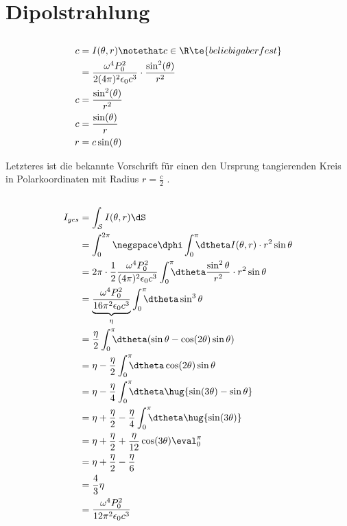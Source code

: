 \documentclass[11pt]{article}
\begin{document}
\section{Dipolstrahlung}
\subsection{}
\begin{align*}
    c &= I(\theta,r)\notethat c\in\R  \te{ beliebig aber fest}\\
    &= \frac{\omega^4 P_0^2}{2(4\pi)^2\epsilon_0 c^3}\cdot \frac{\sin^2(\theta)}{r^2}\\
    c &= \frac{\sin^2(\theta)}{r^2}\\
    c &= \frac{\sin(\theta)}{r}\\
    r &= c \sin(\theta)\
\end{align*}
\begin{adjustwidth}{20pt}{}
    Letzteres ist die bekannte Vorschrift für einen den Ursprung tangierenden Kreis in 
    Polarkoordinaten mit Radius \(r=\frac{c}{2}\) . 
\end{adjustwidth}

\subsection{}
\begin{align*}
    I_{ges} &= \int_{\mathcal S} I(\theta,r)\dS\\
    &= \int_{0}^{2\pi}\negspace\dphi\int_{0}^{\pi}\hspace{-0.2cm}\dtheta I(\theta,r)\cdot r^2 \sin\theta\\
    &= 2\pi\cdot \frac{1}{2}\frac{\omega^4 P_0^2}{(4\pi)^2 \epsilon_0 c^3}\int_{0}^{\pi}\hspace{-0.2cm}\dtheta \frac{\sin^2\theta}{r^2}\cdot r^2 \sin\theta\\
    &= \underbrace{\frac{\omega^4 P_0^2}{16\pi^2 \epsilon_0 c^3}}_{\eta}\int_{0}^{\pi}\hspace{-0.2cm}\dtheta\sin^3\theta\\
    &= \frac \eta2 \int_{0}^{\pi}\hspace{-0.2cm}\dtheta(\sin\theta-\cos(2\theta)\sin\theta)\\
    &= \eta - \frac\eta2\int_{0}^{\pi}\hspace{-0.2cm}\dtheta\cos(2\theta)\sin\theta\\
    &= \eta - \frac\eta4 \int_{0}^{\pi}\hspace{-0.2cm}\dtheta\hug{\sin(3\theta)-\sin\theta}\\
    &= \eta + \frac\eta2- \frac\eta4 \int_{0}^{\pi}\hspace{-0.2cm}\dtheta\hug{\sin(3\theta)}\\
    &= \eta + \frac\eta2 + \frac\eta{12} \cos(3\theta)\eval_{0}^{\pi}\\
    &= \eta + \frac\eta2 - \frac\eta{6}\\
    &= \frac{4}{3}\eta\\
    &= \frac{\omega^4 P_0^2}{12\pi^2 \epsilon_0 c^3}
\end{align*}
\end{document}
